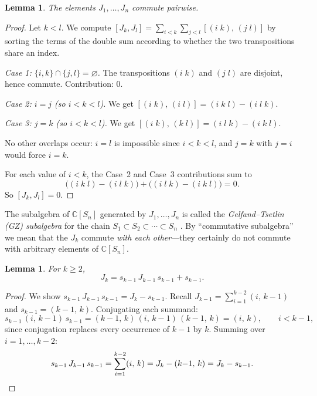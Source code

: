 \documentclass[12pt,a4paper]{article}
\newtheorem{lemma}[theorem]{Lemma}
\theoremstyle{definition}
\theoremstyle{remark}
\newcommand{\C}{\mathbb{C}}
\begin{document}
\begin{lemma}\label{lem:JM-commute}
The elements $J_1, \ldots, J_n$ commute pairwise.
\end{lemma}

\begin{proof}
Let $k < l$. We compute $[J_k, J_l] = \sum_{i < k}\sum_{j < l}
[(i\;k),\,(j\;l)]$ by sorting the terms of the double sum according
to whether the two transpositions share an index.

\emph{Case 1: $\{i,k\} \cap \{j,l\} = \varnothing$.}
The transpositions $(i\;k)$ and $(j\;l)$ are disjoint, hence commute.
Contribution: $0$.

\emph{Case 2: $i = j$ (so $i < k < l$).}
We get $[(i\;k),\,(i\;l)] = (i\;k\;l) - (i\;l\;k)$.

\emph{Case 3: $j = k$ (so $i < k < l$).}
We get $[(i\;k),\,(k\;l)] = (i\;l\;k) - (i\;k\;l)$.

No other overlaps occur: $i = l$ is impossible since $i < k < l$,
and $j = k$ with $j = i$ would force $i = k$.

For each value of $i < k$, the Case~2 and Case~3 contributions sum to
\[
  \bigl((i\;k\;l) - (i\;l\;k)\bigr)
  + \bigl((i\;l\;k) - (i\;k\;l)\bigr) = 0.
\]
So $[J_k, J_l] = 0$.
\end{proof}

The subalgebra of $\C[S_n]$ generated by $J_1, \ldots, J_n$ is called
the \emph{Gelfand--Tsetlin (GZ) subalgebra} for the chain
$S_1 \subset S_2 \subset \cdots \subset S_n$
\cite{OkounkovVershik}. By ``commutative subalgebra'' we mean that
the $J_k$ commute \emph{with each other}---they certainly do not
commute with arbitrary elements of $\C[S_n]$.

\begin{lemma}\label{lem:JM-recursion}
For $k \geqslant 2$,
\begin{equation}\label{eq:JM-recursion}
  J_k = s_{k-1}\, J_{k-1}\, s_{k-1} + s_{k-1}.
\end{equation}
\end{lemma}

\begin{proof}
We show $s_{k-1}\, J_{k-1}\, s_{k-1} = J_k - s_{k-1}$.
Recall $J_{k-1} = \sum_{i=1}^{k-2} (i,\, k{-}1)$ and
$s_{k-1} = (k{-}1,\, k)$. Conjugating each summand:
\[
  s_{k-1}\,(i,\, k{-}1)\, s_{k-1}
  = (k{-}1,\, k)\,(i,\, k{-}1)\,(k{-}1,\, k)
  = (i,\, k),
  \qquad i < k{-}1,
\]
since conjugation replaces every occurrence of $k{-}1$ by $k$.
Summing over $i = 1, \ldots, k{-}2$:
\[
  s_{k-1}\, J_{k-1}\, s_{k-1}
  = \sum_{i=1}^{k-2} (i,\, k)
  = J_k - (k{-}1,\, k)
  = J_k - s_{k-1}. \qedhere
\]
\end{proof}
\end{document}
